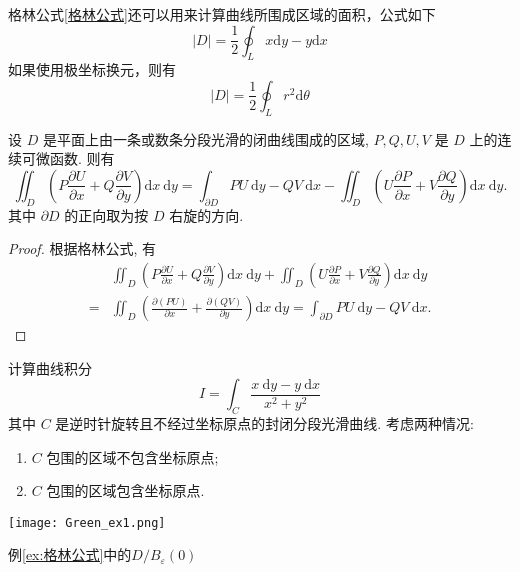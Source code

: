 格林公式\ref{格林公式}还可以用来计算曲线所围成区域的面积，公式如下
\[
|D|=\frac{1}{2}\oint_L x \mathrm{d} y-y \mathrm{d} x
\]
如果使用极坐标换元，则有
\[
|D|=\frac{1}{2}\oint_L r^2 \mathrm{d} \theta 
\]

\begin{corollary}[二维分部积分公式]
    设 $D$ 是平面上由一条或数条分段光滑的闭曲线围成的区域, $P, Q, U, V$ 是 $D$ 上的连续可微函数. 则有
$$
\iint_D\left(P \frac{\partial U}{\partial x}+Q \frac{\partial V}{\partial y}\right) \mathrm{d} x \mathrm{~d} y=\int_{\partial D} P U \mathrm{~d} y-Q V \mathrm{~d} x-\iint_D\left(U \frac{\partial P}{\partial x}+V \frac{\partial Q}{\partial y}\right) \mathrm{d} x \mathrm{~d} y .
$$
其中 $\partial D$ 的正向取为按 $D$ 右旋的方向.
\end{corollary}
\begin{proof}
    根据格林公式, 有 
    \begin{align*}
        & \iint_D\left(P \frac{\partial U}{\partial x}+Q \frac{\partial V}{\partial y}\right) \mathrm{d} x \mathrm{~d} y+\iint_D\left(U \frac{\partial P}{\partial x}+V \frac{\partial Q}{\partial y}\right) \mathrm{d} x \mathrm{~d} y \\
        = & \iint_D\left(\frac{\partial(P U)}{\partial x}+\frac{\partial(Q V)}{\partial y}\right) \mathrm{d} x \mathrm{~d} y=\int_{\partial D} P U \mathrm{~d} y-Q V \mathrm{~d} x .
    \end{align*}
\end{proof}

\begin{example}[计算曲线积分]\label{ex:格林公式}
    计算曲线积分
    $$
    I=\int_C \frac{x \mathrm{~d} y-y \mathrm{~d} x}{x^2+y^2}
    $$
    其中 $C$ 是逆时针旋转且不经过坐标原点的封闭分段光滑曲线. 考虑两种情况:
    \begin{enumerate}
        \item $C$ 包围的区域不包含坐标原点;
        \item $C$ 包围的区域包含坐标原点.
    \end{enumerate}
\end{example}

\begin{marginfigure}
    \centering
    \texttt{[image: Green\_ex1.png]}
    \caption{例\ref{ex:格林公式}中的$D / B_{\varepsilon}(0)$}
    \label{fig:格林公式ex1}
\end{marginfigure}

